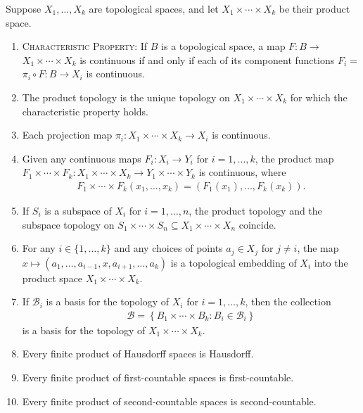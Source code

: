 \begin{proposition}
    Suppose $X_1, \ldots, X_k$ are topological spaces, and let $X_1 \times \cdots \times X_k$ be their product space.
    \begin{enumerate}[label=(\alph*)]
    \item {\color{靛蓝}\textsc{Characteristic Property}: If $B$ is a topological space, a map $F: B \rightarrow$ $X_1 \times \cdots \times X_k$ is continuous if and only if each of its component functions $F_i=$ $\pi_i \circ F: B \rightarrow X_i$ is continuous.}
    \item The product topology is the unique topology on $X_1 \times \cdots \times X_k$ for which the characteristic property holds.
    \item Each projection map $\pi_i: X_1 \times \cdots \times X_k \rightarrow X_i$ is continuous.
    \item Given any continuous maps $F_i: X_i \rightarrow Y_i$ for $i=1, \ldots, k$, the product map $F_1 \times \cdots \times F_k: X_1 \times \cdots \times X_k \rightarrow Y_1 \times \cdots \times Y_k$ is continuous, where
    \begin{align*}
    F_1 \times \cdots \times F_k\left(x_1, \ldots, x_k\right)=\left(F_1\left(x_1\right), \ldots, F_k\left(x_k\right)\right) .
    \end{align*}
    \item If $S_i$ is a subspace of $X_i$ for $i=1, \ldots, n$, the product topology and the subspace topology on $S_1 \times \cdots \times S_n \subseteq X_1 \times \cdots \times X_n$ coincide.
    \item For any $i \in\{1, \ldots, k\}$ and any choices of points $a_j \in X_j$ for $j \neq i$, the map $x \mapsto\left(a_1, \ldots, a_{i-1}, x, a_{i+1}, \ldots, a_k\right)$ is a topological embedding of $X_i$ into the product space $X_1 \times \cdots \times X_k$.
    \item If $\mathscr{B}_i$ is a basis for the topology of $X_i$ for $i=1, \ldots, k$, then the collection
    \begin{align*}
    \mathscr{B}=\left\{B_1 \times \cdots \times B_k: B_i \in \mathscr{B}_i\right\}
    \end{align*}
    is a basis for the topology of $X_1 \times \cdots \times X_k$.
    \item Every finite product of Hausdorff spaces is Hausdorff.
    \item Every finite product of first-countable spaces is first-countable.
    \item Every finite product of second-countable spaces is second-countable.
\end{enumerate}
\end{proposition}
